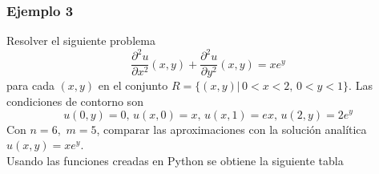 \documentclass[a4paper]{article}
\begin{document}
\subsubsection{Ejemplo 3}
Resolver el siguiente problema 
\begin{equation}
\frac{\partial^2 u}{\partial x^2}(x,y)+\frac{\partial^2 u}{\partial y^2}(x,y)=x e^{y}
\end{equation}
para cada $(x,y)$ en el conjunto $R=\{ (x,y)|\, 0<x<2,\, 0<y<1 \}$. Las condiciones de contorno  son 
\begin{equation*}
u(0,y)=0,\,u(x,0)=x,\, u(x,1)=ex,\, u(2,y)=2e^y
\end{equation*}
Con $n=6,\,\,m=5$, comparar las aproximaciones con la solución analítica $u(x,y)=x e^y$.\\
Usando las funciones creadas en Python se obtiene la siguiente tabla\\
\end{document}
